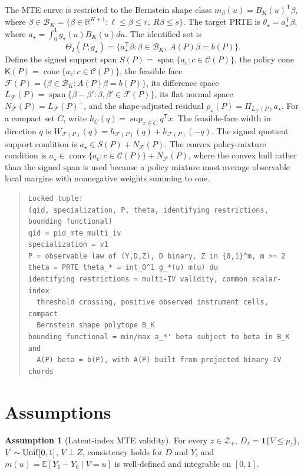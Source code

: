 \documentclass[11pt]{article}
\newcommand{\E}{\mathbb{E}}
\newcommand{\one}{\mathbf{1}}
\newcommand{\transpose}{\mathsf{T}}
\theoremstyle{definition}
\newtheorem{assumption}{Assumption}
\theoremstyle{plain}
\theoremstyle{remark}
\begin{document}
The MTE curve is restricted to the Bernstein shape class \(m_\beta(u)=B_K(u)^\transpose\beta\), where \(\beta\in\mathcal B_K=\{\beta\in\mathbb R^{K+1}:\ell\leq\beta\leq r,\ R\beta\leq s\}\). The target PRTE is \(\theta_\star=a_\star^\transpose\beta\), where \(a_\star=\int_0^1g_\star(u)B_K(u)du\). The identified set is
\[
\Theta_I(P;g_\star)=\{a_\star^\transpose\beta:\beta\in\mathcal B_K,\ A(P)\beta=b(P)\}.
\]
Define the signed support span \(S(P)=\operatorname{span}\{a_c:c\in\mathcal C(P)\}\), the policy cone \(\mathsf K(P)=\overline{\operatorname{cone}}\{a_c:c\in\mathcal C(P)\}\), the feasible face \(\mathcal F(P)=\{\beta\in\mathcal B_K:A(P)\beta=b(P)\}\), its difference space \(L_{\mathcal F}(P)=\operatorname{span}\{\beta-\beta':\beta,\beta'\in\mathcal F(P)\}\), its flat normal space \(N_{\mathcal F}(P)=L_{\mathcal F}(P)^\perp\), and the shape-adjusted residual \(\rho_\star(P)=\Pi_{L_{\mathcal F}(P)}a_\star\). For a compact set \(C\), write \(h_C(q)=\sup_{x\in C}q^\transpose x\). The feasible-face width in direction \(q\) is \(W_{\mathcal F(P)}(q)=h_{\mathcal F(P)}(q)+h_{\mathcal F(P)}(-q)\).
The signed quotient support condition is \(a_\star\in S(P)+N_{\mathcal F}(P)\). The convex policy-mixture condition is \(a_\star\in\operatorname{conv}\{a_c:c\in\mathcal C(P)\}+N_{\mathcal F}(P)\), where the convex hull rather than the signed span is used because a policy mixture must average observable local margins with nonnegative weights summing to one.

\begin{quote}
\begin{verbatim}
Locked tuple:
(qid, specialization, P, theta, identifying restrictions, bounding functional)
qid = pid_mte_multi_iv
specialization = v1
P = observable law of (Y,D,Z), D binary, Z in {0,1}^m, m >= 2
theta = PRTE theta_* = int_0^1 g_*(u) m(u) du
identifying restrictions = multi-IV validity, common scalar-index
  threshold crossing, positive observed instrument cells, compact
  Bernstein shape polytope B_K
bounding functional = min/max a_*' beta subject to beta in B_K and
  A(P) beta = b(P), with A(P) built from projected binary-IV chords
\end{verbatim}
\end{quote}

\section{Assumptions}
\begin{assumption}[Latent-index MTE validity]\label{ass:latent-index}
For every \(z\in\mathcal Z_+\), \(D_z=\one\{V\leq p_z\}\), \(V\sim{\rm Unif}[0,1]\), \(V\perp Z\), consistency holds for \(D\) and \(Y\), and \(m(u)=\E[Y_1-Y_0\mid V=u]\) is well-defined and integrable on \([0,1]\).
\end{assumption}
\end{document}
